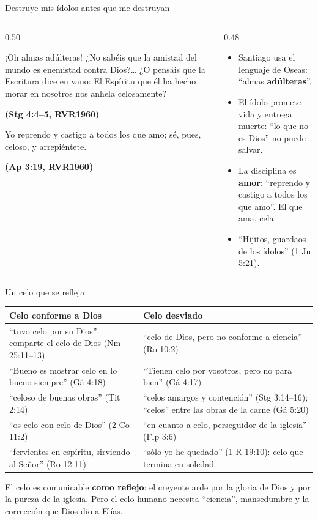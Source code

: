\documentclass[hyperref={bookmarks=false},aspectratio=169]{beamer}
\newcommand{\fuente}[1]{\par\hfill{\upshape\bfseries\footnotesize\textcolor{azul}{#1}}}
\newcommand{\destacar}[1]{\textbf{\textcolor{azul}{#1}}}
\begin{document}
\begin{frame}{Destruye mis ídolos antes que me destruyan}
\begin{columns}[t,onlytextwidth]
\begin{column}{0.50\textwidth}
\begin{cita}¡Oh almas adúlteras! ¿No sabéis que la amistad del mundo es enemistad contra Dios?\ldots{} ¿O pensáis que la Escritura dice en vano: El Espíritu que él ha hecho morar en nosotros nos anhela celosamente?\fuente{(Stg 4:4--5, RVR1960)}\end{cita}
\begin{cita}Yo reprendo y castigo a todos los que amo; sé, pues, celoso, y arrepiéntete.\fuente{(Ap 3:19, RVR1960)}\end{cita}
\end{column}
\begin{column}{0.48\textwidth}\small
\begin{itemize}
\item Santiago usa el lenguaje de Oseas: ``almas \destacar{adúlteras}''.
\item El ídolo promete vida y entrega muerte: ``lo que no es Dios'' no puede salvar.
\item La disciplina es \destacar{amor}: ``reprendo y castigo a todos los que amo''. El que ama, cela.
\item ``Hijitos, guardaos de los ídolos'' (1 Jn 5:21).
\end{itemize}
\end{column}
\end{columns}
\end{frame}

\begin{frame}{Un celo que se refleja}
\scriptsize\renewcommand{\arraystretch}{1.2}
\begin{tabular}{@{}>{\RaggedRight\arraybackslash}p{5.8cm}>{\RaggedRight\arraybackslash}p{6.0cm}@{}}
\toprule
\textbf{Celo conforme a Dios} & \textbf{Celo desviado} \\ \midrule
``tuvo celo por su Dios'': comparte el celo de Dios (Nm 25:11--13) & ``celo de Dios, pero no conforme a ciencia'' (Ro 10:2) \\
``Bueno es mostrar celo en lo bueno siempre'' (Gá 4:18) & ``Tienen celo por vosotros, pero no para bien'' (Gá 4:17) \\
``celoso de buenas obras'' (Tit 2:14) & ``celos amargos y contención'' (Stg 3:14--16); ``celos'' entre las obras de la carne (Gá 5:20) \\
``os celo con celo de Dios'' (2 Co 11:2) & ``en cuanto a celo, perseguidor de la iglesia'' (Flp 3:6) \\
``fervientes en espíritu, sirviendo al Señor'' (Ro 12:11) & ``sólo yo he quedado'' (1 R 19:10): celo que termina en soledad \\
\bottomrule
\end{tabular}\par\medskip
\small\RaggedRight El celo es comunicable \destacar{como reflejo}: el creyente arde por la gloria de Dios y por la pureza de la iglesia. Pero el celo humano necesita ``ciencia'', mansedumbre y la corrección que Dios dio a Elías.
\end{frame}
\end{document}
